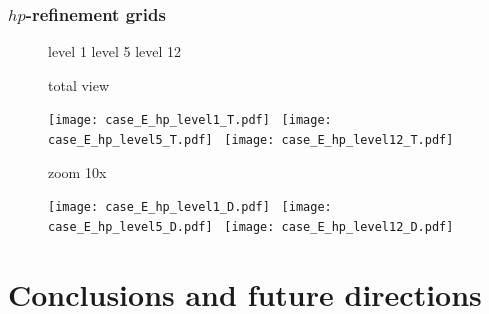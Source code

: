 \documentclass[compress]{beamer}
\newcommand{\vertical}[1]{\begin{sideways}{#1}\end{sideways}}
\begin{document}
\begin{frame}
\frametitle{$hp$-refinement grids}

\begin{figure}
\hspace*{-0.4cm} {level 1}
\hspace{2cm} {level 5}
\hspace{2cm} {level 12}

\begin{center}
\hspace*{-0.5cm}\vertical{\hspace*{0.5cm} total view}
\texttt{[image: case\_E\_hp\_level1\_T.pdf]} \,
\texttt{[image: case\_E\_hp\_level5\_T.pdf]} \,
\texttt{[image: case\_E\_hp\_level12\_T.pdf]}

\vspace{2mm}

\hspace*{-0.5cm}\vertical{\hspace*{0.5cm}  zoom 10x}
\texttt{[image: case\_E\_hp\_level1\_D.pdf]} \,
\texttt{[image: case\_E\_hp\_level5\_D.pdf]} \,
\texttt{[image: case\_E\_hp\_level12\_D.pdf]}
\vspace{2mm}

\end{center}
\end{figure}

\end{frame}
\section[Conclusion]{Conclusions and future directions}
\end{document}

